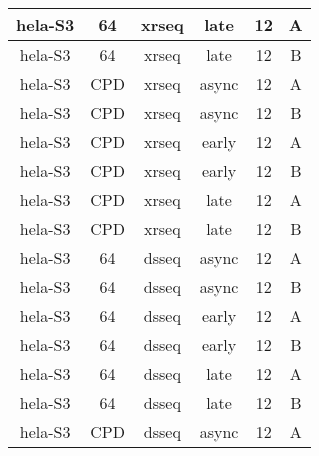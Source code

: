 \begin{table}[H]
\begin{adjustbox}{max width=\textwidth}
\begin{tabular}{cccccc}
    \gls{hela}-S3           & \gls{64}           & \gls{xrseq}         & late             & 12            & A                  \\ \hline 
    \gls{hela}-S3           & \gls{64}           & \gls{xrseq}         & late             & 12            & B                  \\ \hline 
    \gls{hela}-S3           & \gls{CPD}              & \gls{xrseq}         & async            & 12            & A                  \\ \hline 
    \gls{hela}-S3           & \gls{CPD}              & \gls{xrseq}         & async            & 12            & B                  \\ \hline 
    \gls{hela}-S3           & \gls{CPD}              & \gls{xrseq}         & early            & 12            & A                  \\ \hline 
    \gls{hela}-S3           & \gls{CPD}              & \gls{xrseq}         & early            & 12            & B                  \\ \hline 
    \gls{hela}-S3           & \gls{CPD}              & \gls{xrseq}         & late             & 12            & A                  \\ \hline 
    \gls{hela}-S3           & \gls{CPD}              & \gls{xrseq}         & late             & 12            & B                  \\ \hline 
    \gls{hela}-S3           & \gls{64}           & \gls{dsseq}     & async            & 12            & A                  \\ \hline 
    \gls{hela}-S3           & \gls{64}           & \gls{dsseq}     & async            & 12            & B                  \\ \hline 
    \gls{hela}-S3           & \gls{64}           & \gls{dsseq}     & early            & 12            & A                  \\ \hline 
    \gls{hela}-S3           & \gls{64}           & \gls{dsseq}     & early            & 12            & B                  \\ \hline 
    \gls{hela}-S3           & \gls{64}           & \gls{dsseq}     & late             & 12            & A                  \\ \hline 
    \gls{hela}-S3           & \gls{64}           & \gls{dsseq}     & late             & 12            & B                  \\ \hline 
    \gls{hela}-S3           & \gls{CPD}              & \gls{dsseq}     & async            & 12            & A                  \\ \hline 

\end{tabular}
\end{adjustbox}
\end{table}
